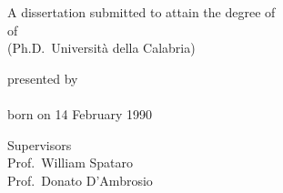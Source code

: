 \begin{titlepage}
    \begin{center}
        \large

        \hfill

        \vfill

        \begingroup
            \spacedallcaps{\myTitle}
        \endgroup

        \vfill

        \begingroup
            A dissertation submitted to attain the degree of\\
            \vspace{0.5em}
            of
             \\
            (Ph.D.\ Universit\`a della Calabria)
        \endgroup

        \vfill

        \begingroup
            presented by\\
            \vspace{0.5em}
            \spacedlowsmallcaps{\myName}\\
            \vspace{0.5em}
            born on 14 February 1990\\
        \endgroup

        \vfill

 \begingroup
      Supervisors\\
    \vspace{0.5em}
     Prof.\ William Spataro\\
     Prof.\ Donato D'Ambrosio
 \endgroup

        \vfill

        \myTime%

        \vfill
    \end{center}
\end{titlepage}
